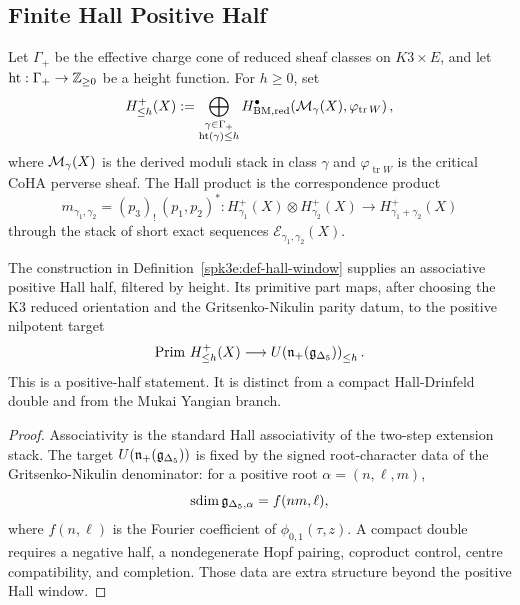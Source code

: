 \subsection{Finite Hall Positive Half}
\label{spk3e:finite-hall-positive-half}

\begin{definition}
\label{spk3e:def-hall-window}
Let \(\Gamma_+\) be the effective charge cone of reduced sheaf classes on
\(K3\times E\), and let \(\operatorname{ht}:\Gamma_+\to\mathbb{Z}_{\geq0}\) be
a height function. For \(h\geq0\), set
\[
 H^+_{\leq h}(X)
 :=
 \bigoplus_{\substack{\gamma\in\Gamma_+\\ \operatorname{ht}(\gamma)\leq h}}
 H^\bullet_{\mathrm{BM},\mathrm{red}}\!\left(\mathcal{M}_\gamma(X),\varphi_{\operatorname{tr}W}\right),
\]
where \(\mathcal{M}_\gamma(X)\) is the derived moduli stack in class \(\gamma\)
and \(\varphi_{\operatorname{tr}W}\) is the critical CoHA perverse sheaf.
The Hall product is the correspondence product
\[
 m_{\gamma_1,\gamma_2}
 =
 (p_3)_!\,(p_1,p_2)^*
 :
 H^+_{\gamma_1}(X)\otimes H^+_{\gamma_2}(X)
 \longrightarrow H^+_{\gamma_1+\gamma_2}(X)
\]
through the stack of short exact sequences
\(\mathcal E_{\gamma_1,\gamma_2}(X)\).
\end{definition}

\begin{proposition}
\label{spk3e:prop-bps-positive}
The construction in Definition~\ref{spk3e:def-hall-window} supplies an
associative positive Hall half, filtered by height. Its primitive part
maps, after choosing the K3 reduced orientation and the Gritsenko-Nikulin
parity datum, to the positive nilpotent target
\[
 \operatorname{Prim}\,H^+_{\leq h}(X)
 \longrightarrow
 U\!\left(\mathfrak{n}_+(\mathfrak{g}_{\Delta_5})\right)_{\leq h}.
\]
This is a positive-half statement. It is distinct from a compact
Hall-Drinfeld double and from the Mukai Yangian branch.
\end{proposition}

\begin{proof}
Associativity is the standard Hall associativity of the two-step
extension stack. The target \(U(\mathfrak{n}_+(\mathfrak{g}_{\Delta_5}))\) is fixed by the
signed root-character data of the Gritsenko-Nikulin denominator:
for a positive root \(\alpha=(n,\ell,m)\),
\[
 \operatorname{sdim}\mathfrak{g}_{\Delta_5,\alpha}
 =
 f(nm,\ell),
\]
where \(f(n,\ell)\) is the Fourier coefficient of
\(\phi_{0,1}(\tau,z)\). A compact double requires a negative half, a
nondegenerate Hopf pairing, coproduct control, centre compatibility, and
completion. Those data are extra structure beyond the positive Hall
window.
\end{proof}

